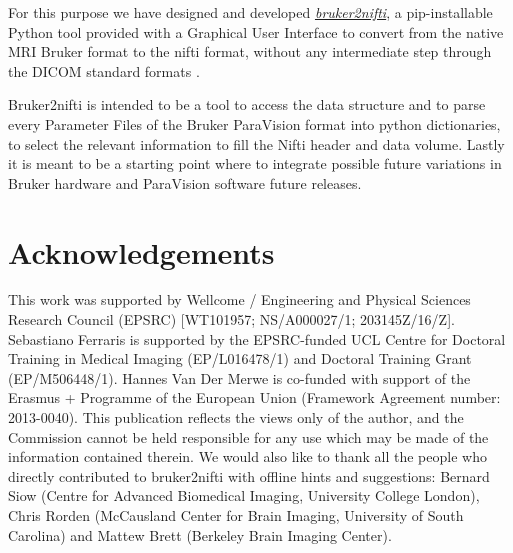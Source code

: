 \documentclass{article}
\begin{document}

For this purpose we have designed and developed \href{https://github.com/SebastianoF/bruker2nifti}{\emph{bruker2nifti}}, a pip-installable Python tool provided with a Graphical User Interface to convert from the native MRI Bruker format %
to the nifti format, without any intermediate step through the DICOM standard formats \cite{Mildenberger2002}. %

Bruker2nifti is intended to be a tool to access the data structure and to parse every Parameter Files of the Bruker ParaVision format into python dictionaries, to select the relevant information to fill the Nifti header and data volume. Lastly it is meant to be a starting point where to integrate possible future variations in Bruker hardware and ParaVision software future releases.


\section{Acknowledgements}

This work was supported by Wellcome / Engineering and Physical Sciences Research Council (EPSRC) [WT101957; NS/A000027/1; 203145Z/16/Z]. Sebastiano Ferraris is supported by the EPSRC-funded UCL Centre for Doctoral Training in Medical Imaging (EP/L016478/1) and Doctoral Training Grant (EP/M506448/1).
Hannes Van Der Merwe is co-funded with support of the Erasmus + Programme of the European Union (Framework Agreement number: 2013-0040). This publication reflects the views only of the author, and the Commission cannot be held responsible for any use which may be made of the information contained therein. 
We would also like to thank all the people who directly contributed to bruker2nifti with offline hints and suggestions: Bernard Siow (Centre for Advanced Biomedical Imaging, University College London), Chris Rorden (McCausland Center for Brain Imaging, University of South Carolina) and Mattew Brett (Berkeley Brain Imaging Center).

{}

\end{document}
